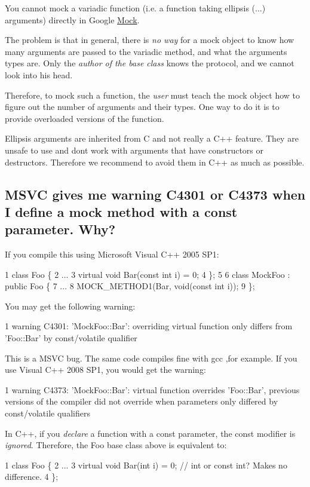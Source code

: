 You cannot mock a variadic function (i.\+e. a function taking ellipsis ({\ttfamily ...}) arguments) directly in Google \hyperlink{classMock}{Mock}.

The problem is that in general, there is {\itshape no way} for a mock object to know how many arguments are passed to the variadic method, and what the arguments\textquotesingle{} types are. Only the {\itshape author of the base class} knows the protocol, and we cannot look into his head.

Therefore, to mock such a function, the {\itshape user} must teach the mock object how to figure out the number of arguments and their types. One way to do it is to provide overloaded versions of the function.

Ellipsis arguments are inherited from C and not really a C++ feature. They are unsafe to use and don\textquotesingle{}t work with arguments that have constructors or destructors. Therefore we recommend to avoid them in C++ as much as possible.

\subsection*{M\+S\+VC gives me warning C4301 or C4373 when I define a mock method with a const parameter. Why?}

If you compile this using Microsoft Visual C++ 2005 S\+P1\+: 
\begin{DoxyCode}
1 class Foo \{
2   ...
3   virtual void Bar(const int i) = 0;
4 \};
5 
6 class MockFoo : public Foo \{
7   ...
8   MOCK\_METHOD1(Bar, void(const int i));
9 \};
\end{DoxyCode}
 You may get the following warning\+: 
\begin{DoxyCode}
1 warning C4301: 'MockFoo::Bar': overriding virtual function only differs from 'Foo::Bar' by const/volatile
       qualifier
\end{DoxyCode}


This is a M\+S\+VC bug. The same code compiles fine with gcc ,for example. If you use Visual C++ 2008 S\+P1, you would get the warning\+: 
\begin{DoxyCode}
1 warning C4373: 'MockFoo::Bar': virtual function overrides 'Foo::Bar', previous versions of the compiler did
       not override when parameters only differed by const/volatile qualifiers
\end{DoxyCode}


In C++, if you {\itshape declare} a function with a {\ttfamily const} parameter, the {\ttfamily const} modifier is {\itshape ignored}. Therefore, the {\ttfamily Foo} base class above is equivalent to\+: 
\begin{DoxyCode}
1 class Foo \{
2   ...
3   virtual void Bar(int i) = 0;  // int or const int?  Makes no difference.
4 \};
\end{DoxyCode}


